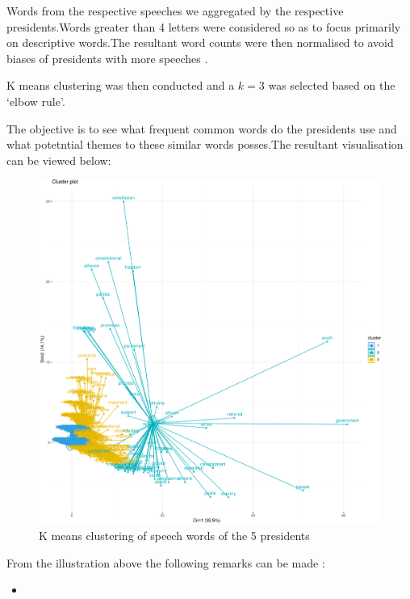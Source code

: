 \documentclass[]{article}
\begin{document}
Words from the respective speeches we aggregated by the respective
presidents.Words greater than 4 letters were considered so as to focus
primarily on descriptive words.The resultant word counts were then
normalised to avoid biases of presidents with more speeches .

K means clustering was then conducted and a \(k=3\) was selected based
on the `elbow rule'.

The objective is to see what frequent common words do the presidents use
and what potetntial themes to these similar words posses.The resultant
visualisation can be viewed below:

\begin{figure}[H]

{\centering \includegraphics{datasci_fi_Assignment_2_files/figure-latex/kmeans -1} 

}

\caption{K means clustering of speech words of the 5 presidents}\label{fig:kmeans }
\end{figure}

From the illustration above the following remarks can be made :

\begin{itemize}

\item


\end{itemize}
\end{document}
